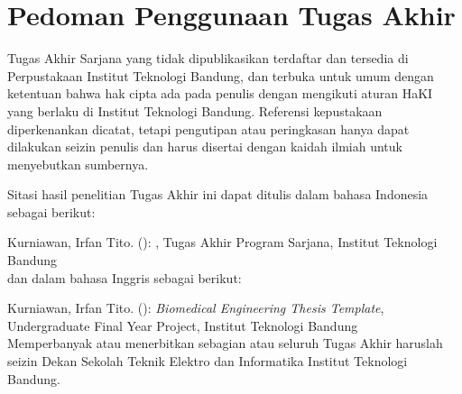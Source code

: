 \clearpage
\chapter*{Pedoman Penggunaan Tugas Akhir}

Tugas Akhir Sarjana yang tidak dipublikasikan terdaftar dan tersedia di Perpustakaan Institut Teknologi Bandung, dan terbuka untuk umum dengan ketentuan bahwa hak cipta ada pada penulis dengan mengikuti aturan HaKI yang berlaku di Institut Teknologi Bandung. Referensi kepustakaan diperkenankan dicatat, tetapi pengutipan atau peringkasan hanya dapat dilakukan seizin penulis dan harus disertai dengan kaidah ilmiah untuk menyebutkan sumbernya.

Sitasi hasil penelitian Tugas Akhir ini dapat ditulis dalam bahasa Indonesia sebagai berikut:

\hangindent=0.7cm Kurniawan, Irfan Tito. (\the\year): \textit{\thetitle}, Tugas Akhir Program Sarjana, Institut Teknologi Bandung\\

dan dalam bahasa Inggris sebagai berikut:

\hangindent=0.7cm Kurniawan, Irfan Tito. (\the\year): \textit{Biomedical Engineering Thesis Template}, Undergraduate Final Year Project, Institut Teknologi Bandung\\

Memperbanyak atau menerbitkan sebagian atau seluruh Tugas Akhir haruslah seizin Dekan Sekolah Teknik Elektro dan Informatika Institut Teknologi Bandung.

\clearpage